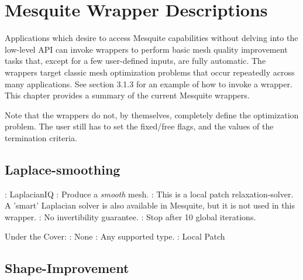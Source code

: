 \chapter{Mesquite Wrapper Descriptions}
\label{sec:wrappers}

Applications which desire to access Mesquite capabilities without delving 
into the low-level API can invoke wrappers to perform basic mesh quality 
improvement tasks that, except for a few user-defined inputs, are fully 
automatic. The wrappers target classic mesh optimization problems that occur 
repeatedly across many applications. See section 3.1.3 for an example of how
to invoke a wrapper. 
This chapter provides a summary of the current Mesquite wrappers. \newline

\noindent Note that the wrappers do not, by themselves, completely define
the optimization problem.  The user still has to set the fixed/free flags,
and the values of the termination criteria.  \newline

\section{Laplace-smoothing} \label{sec:LaplacianIQ}

: LaplacianIQ \newline
{}: Produce a {\it smooth} mesh. \newline
{}: This is a local patch relaxation-solver. A 'smart' 
Laplacian solver is also available in Mesquite, but it is not used in this 
wrapper.  \newline
{}: No invertibility guarantee. \newline 
{}: Stop after 10 global iterations. \newline \newline

\noindent Under the Cover: \newline
{}: None \newline
{}: Any supported type. \newline
{}: Local Patch \newline



\section{Shape-Improvement} \label{sec:ShapeImprover}

